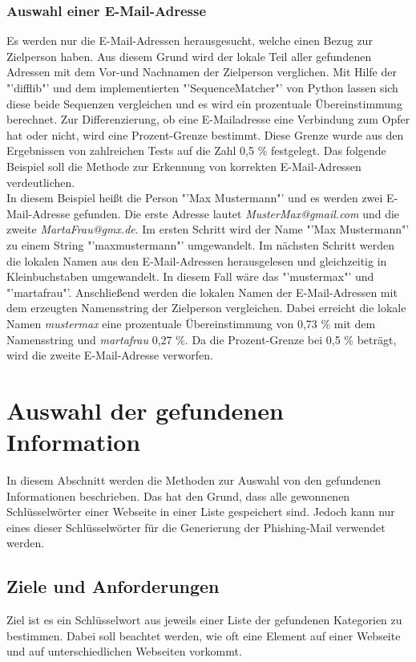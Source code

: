 		\subsubsection{Auswahl einer E-Mail-Adresse}
		Es werden nur die E-Mail-Adressen herausgesucht, welche einen Bezug zur Zielperson haben. Aus diesem Grund wird der lokale Teil aller gefundenen Adressen mit dem Vor-und Nachnamen der Zielperson verglichen. Mit Hilfe der "'difflib"' und dem implementierten "'SequenceMatcher"' von Python lassen sich diese beide Sequenzen vergleichen und es wird ein prozentuale Übereinstimmung berechnet. Zur Differenzierung, ob eine E-Mailadresse eine Verbindung zum Opfer hat oder nicht, wird eine Prozent-Grenze bestimmt. Diese Grenze wurde aus den Ergebnissen von zahlreichen Tests auf die Zahl 0,5 \% festgelegt. Das folgende Beispiel soll die Methode zur Erkennung von korrekten E-Mail-Adressen verdeutlichen.\\
		In diesem Beispiel heißt die Person "'Max Mustermann"' und es werden zwei E-Mail-Adresse gefunden. Die erste Adresse lautet \textit{MusterMax@gmail.com} und die zweite \textit{MartaFrau@gmx.de}. Im ersten Schritt wird der Name "'Max Mustermann"' zu einem String "'maxmustermann"' umgewandelt. Im nächsten Schritt werden die lokalen Namen aus den E-Mail-Adressen herausgelesen und gleichzeitig in Kleinbuchstaben umgewandelt. In diesem Fall wäre das "'mustermax"' und "'martafrau"'. Anschließend werden die lokalen Namen der E-Mail-Adressen mit dem erzeugten Namensstring der Zielperson vergleichen. Dabei erreicht die lokale Namen \textit{mustermax} eine prozentuale Übereinstimmung von 0,73 \% mit dem Namensstring und \textit{martafrau} 0,27 \%. Da die Prozent-Grenze bei 0,5 \% beträgt, wird die zweite E-Mail-Adresse verworfen.
		
\section{Auswahl der gefundenen Information}
In diesem Abschnitt werden die Methoden zur Auswahl von den gefundenen Informationen beschrieben. Das hat den Grund, dass alle gewonnenen Schlüsselwörter einer Webseite in einer Liste gespeichert sind. Jedoch kann nur eines dieser Schlüsselwörter für die Generierung der Phishing-Mail verwendet werden.
	\subsection{Ziele und Anforderungen}
	Ziel ist es ein Schlüsselwort aus jeweils einer Liste der gefundenen Kategorien zu bestimmen. Dabei soll beachtet werden, wie oft eine Element auf einer Webseite und auf unterschiedlichen Webseiten vorkommt.
	
